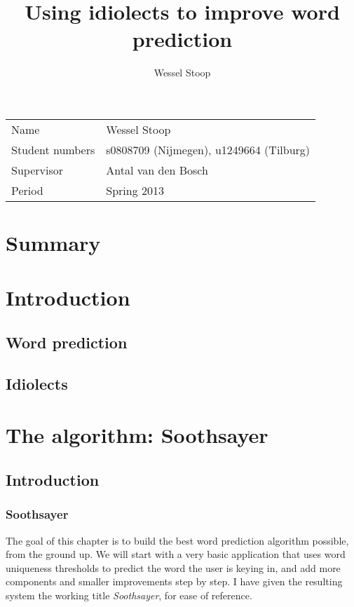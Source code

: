 \documentclass[12pt]{article}
\title{Using idiolects to improve word prediction}
\author{Wessel Stoop}
\let\stdsection\section
\renewcommand\section{\newpage\stdsection}
\begin{document}
\maketitle

\begin{table}[h]
\begin{tabular}{ll}
Name&Wessel Stoop\\
Student numbers&s0808709 (Nijmegen), u1249664 (Tilburg)\\
Supervisor&Antal van den Bosch\\
Period&Spring 2013\\
\end{tabular}
\end{table}

\tableofcontents

\section{Summary}

\section{Introduction}

\subsection{Word prediction}


\subsection{Idiolects}










\section{The algorithm: Soothsayer}

\subsection{Introduction}

\subsubsection{Soothsayer}
The goal of this chapter is to build the best word prediction algorithm possible, from the ground up. We will start with a very basic application that uses word uniqueness thresholds to predict the word the user is keying in, and add more components and smaller improvements step by step. I have given the resulting system the working title \emph{Soothsayer}, for ease of reference.
\end{document}
